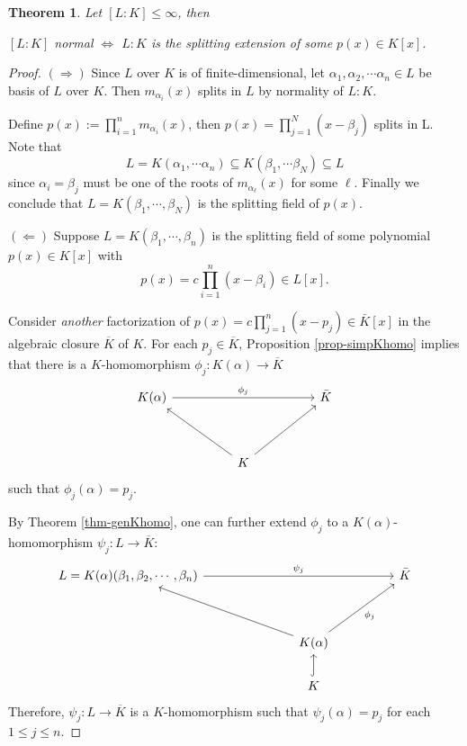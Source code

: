 \documentclass[11pt]{book}
\newtheorem{theorem}{Theorem}[section]
\begin{document}
\begin{theorem} \label{thm-normalsplitext}
    Let $[L:K]\le \infty$, then 
    \begin{center}
    $[L:K]$ normal \quad $\Leftrightarrow$ \quad $L:K $ is the splitting extension of some $p(x)\in K[x]$.   
    \end{center}
\end{theorem}
\begin{proof}

        $(\Rightarrow)$ 
        Since $L$ over $K$ is of finite-dimensional, let $\alpha_{1}, \alpha_{2},\cdots \alpha_n \in L$ be basis of $L$ over $K$. Then $m_{\alpha_{i}}(x)$ splits in $L$ by normality of $L:K$.
        
        Define $p(x) :=\prod_{i=1}^n m_{\alpha_{i}}(x)$, then $p(x)=\prod_{j=1}^N (x-\beta_j)$ splits in L. Note that 
        $$L=K(\alpha_1,\cdots \alpha_n)\subseteq K(\beta_1,\cdots \beta_N)\subseteq L$$
        since $\alpha_i = \beta_j$ must be one of the roots of $m_{\alpha_{\ell}}(x)$ for some $\ell$. Finally we conclude that $L=K(\beta_1,\cdots,\beta_N)$ is the splitting field of $p(x)$.

        \vspace{3mm}
        \noindent $(\Leftarrow)$ Suppose $L=K(\beta_1,\cdots,\beta_n)$ is the splitting field of some polynomial $p(x) \in K[x]$ with
        $$p(x) = c \prod_{i=1}^n(x-\beta_i) \in L[x].$$
        
        Consider {\it another} factorization of  $p(x)=c\prod_{j=1}^n (x-p_j)\in \bar{K}[x]$ in the algebraic closure $\overline{K}$ of $K$.
        For each $p_j \in \overline{K}$, Proposition \ref{prop-simpKhomo} implies that there is a $K$-homomorphism $\phi_j: K(\alpha) \to \overline{K}$
        \[\begin{tikzcd}
	{K(\alpha)} &&&& {\bar{K}} \\
	\\
	&& K
	\arrow["{\phi_j}", from=1-1, to=1-5]
	\arrow[from=3-3, to=1-1]
	\arrow[from=3-3, to=1-5]
\end{tikzcd}\]
    such that $\phi_j(\alpha)=p_j$. 
    
    By Theorem \ref{thm-genKhomo}, one can further extend $\phi_j$ to a $K(\alpha)$-homomorphism $\psi_j: L \to \overline{K}$:
    \[\begin{tikzcd}
	{L=K(\alpha)(\beta_1,\beta_2,\cdots,\beta_n)} &&&&& {\bar{K}} \\
	\\
	&&& {K(\alpha)}
	\arrow["{\psi_j}", from=1-1, to=1-6]
	\arrow[from=3-4, to=1-1]
	\arrow["{\phi_j}"', from=3-4, to=1-6] \\
    &&& K \arrow[hook, u]
\end{tikzcd}\]
    Therefore, $\psi_j : L \to \overline{K}$ is a $K$-homomorphism such that $\psi_j(\alpha) = p_j$ for each $1 \leq j \leq n$.
    

\end{proof}
\end{document}
